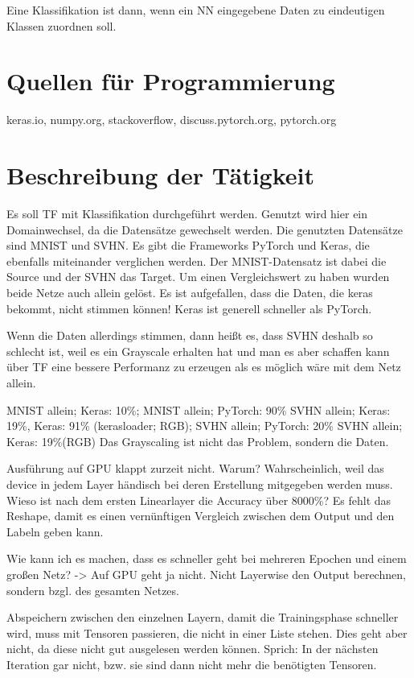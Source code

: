 Eine Klassifikation ist dann, wenn ein NN eingegebene Daten zu 
    eindeutigen Klassen zuordnen soll.

\section{Quellen für Programmierung}
keras.io, numpy.org, stackoverflow, discuss.pytorch.org, pytorch.org

\section{Beschreibung der Tätigkeit}
    
    Es soll TF mit Klassifikation durchgeführt werden. 
    Genutzt wird hier ein Domainwechsel, da die Datensätze gewechselt werden. 
    Die genutzten Datensätze sind MNIST und SVHN. 
    Es gibt die Frameworks PyTorch und Keras, die ebenfalls miteinander 
    verglichen werden. 
    Der MNIST-Datensatz ist dabei die Source und der SVHN das Target. 
    Um einen Vergleichswert zu haben wurden beide Netze auch allein gelöst. 
    Es ist aufgefallen, dass die Daten, die keras bekommt, nicht stimmen können!
    Keras ist generell schneller als PyTorch. 

    Wenn die Daten allerdings stimmen, dann heißt es, dass SVHN deshalb so schlecht 
    ist, weil es ein Grayscale erhalten hat und man es aber schaffen kann über TF 
    eine bessere Performanz zu erzeugen als es möglich wäre mit dem Netz allein.

    MNIST allein; Keras: 10\%; MNIST allein; PyTorch: 90\% 
    SVHN allein; Keras: 19\%, Keras: 91\% (kerasloader; RGB); SVHN allein; PyTorch: 20\%
    SVHN allein; Keras: 19\%(RGB)
    Das Grayscaling ist nicht das Problem, sondern die Daten. 

    Ausführung auf GPU klappt zurzeit nicht. Warum? Wahrscheinlich, 
    weil das device in jedem Layer händisch bei deren Erstellung mitgegeben 
    werden muss.
    Wieso ist nach dem ersten Linearlayer die Accuracy über 8000\%?
    Es fehlt das Reshape, damit es einen vernünftigen Vergleich 
    zwischen dem Output und den Labeln geben kann.
    
    Wie kann ich es machen, dass es schneller geht bei mehreren Epochen 
    und einem großen Netz? -> Auf GPU geht ja nicht.
    Nicht Layerwise den Output berechnen, sondern bzgl. des gesamten Netzes.

    Abspeichern zwischen den einzelnen Layern, damit die Trainingsphase 
    schneller wird, muss mit Tensoren passieren, die nicht in einer Liste 
    stehen. Dies geht aber nicht, da diese nicht gut ausgelesen werden können. 
    Sprich: In der nächsten Iteration gar nicht, bzw. sie sind dann nicht 
    mehr die benötigten Tensoren.

